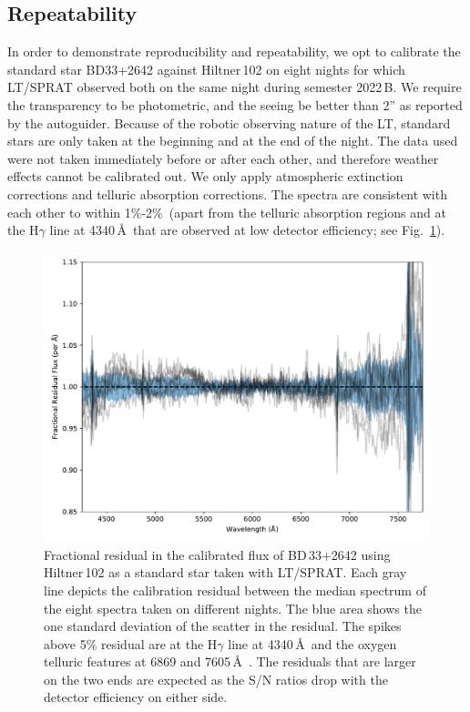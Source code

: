 \documentclass[linenumbers, twocolumn]{aastex631}
\begin{document}
\subsection{Repeatability}
In order to demonstrate reproducibility and repeatability,
we opt to calibrate the standard star BD33+2642 against Hiltner\,102 on
eight nights for which LT/SPRAT observed both on the same night during
semester 2022\,B. We require the transparency to be photometric, and the seeing
be better than 2'' as reported by the autoguider. Because of the robotic
observing nature of the LT, standard stars are only taken at the beginning
and at the end of the night. The data used were not taken immediately
before or after each other, and therefore weather effects cannot be calibrated out.
We only apply atmospheric extinction corrections and telluric
absorption corrections. The spectra are consistent with each other to within
1\%-2\%~(apart from the telluric absorption regions and at the H$\gamma$ line at 4340\,\AA\
that are observed at low detector efficiency; see Fig.~\ref{fig:repeatability}).

\begin{figure}
    \centering
    \includegraphics[width=\columnwidth]{fig_08_sprat_standards_compared.pdf}
    \caption{Fractional residual in the calibrated flux of BD\,33+2642 using
    Hiltner\,102 as a standard star taken with LT/SPRAT. Each gray
    line depicts the calibration residual between the median spectrum of the eight spectra
    taken on different nights. The blue area shows the one standard deviation
    of the scatter in the residual. The spikes above 5\% residual are at the
    H$\gamma$ line at 4340\,\AA\ and the oxygen telluric features at 6869 and
    7605\,\AA\ . The residuals that are larger on the two ends are expected as
    the S/N ratios drop with the detector efficiency on either
    side.}
    \label{fig:repeatability}
\end{figure}
\end{document}
